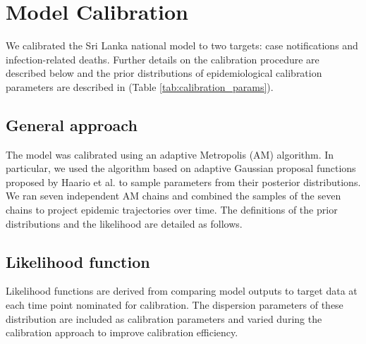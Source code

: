 \section{Model Calibration}
\label{calibration}
We calibrated the Sri Lanka national model to two targets: case notifications and infection-related deaths. Further details on the calibration procedure are described below and the prior distributions of epidemiological calibration parameters are described in (Table \ref{tab:calibration_params}). 

\subsection{General approach}
The model was calibrated using an adaptive Metropolis (AM) algorithm. In particular, we used the algorithm
based on adaptive Gaussian proposal functions proposed by Haario et al. to sample parameters from
their posterior distributions. We ran seven independent AM chains and combined the samples of the
seven chains to project epidemic trajectories over time. The definitions of the prior distributions and the
likelihood are detailed as follows.

\subsection{Likelihood function}
Likelihood functions are derived from comparing model outputs to target data at each time point nominated
for calibration. The dispersion parameters of these distribution are included as calibration parameters and
varied during the calibration approach to improve calibration efficiency.

